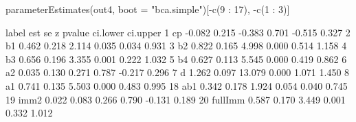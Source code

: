 \begin{Schunk}
\begin{Sinput}
 parameterEstimates(out4, 
                    boot = "bca.simple")[-c(9 : 17), -c(1 : 3)]
\end{Sinput}
\begin{Soutput}
     label    est    se      z pvalue ci.lower ci.upper
1       cp -0.082 0.215 -0.383  0.701   -0.515    0.327
2       b1  0.462 0.218  2.114  0.035    0.034    0.931
3       b2  0.822 0.165  4.998  0.000    0.514    1.158
4       b3  0.656 0.196  3.355  0.001    0.222    1.032
5       b4  0.627 0.113  5.545  0.000    0.419    0.862
6       a2  0.035 0.130  0.271  0.787   -0.217    0.296
7        d  1.262 0.097 13.079  0.000    1.071    1.450
8       a1  0.741 0.135  5.503  0.000    0.483    0.995
18     ab1  0.342 0.178  1.924  0.054    0.040    0.745
19    imm2  0.022 0.083  0.266  0.790   -0.131    0.189
20 fullImm  0.587 0.170  3.449  0.001    0.332    1.012
\end{Soutput}
\end{Schunk}
